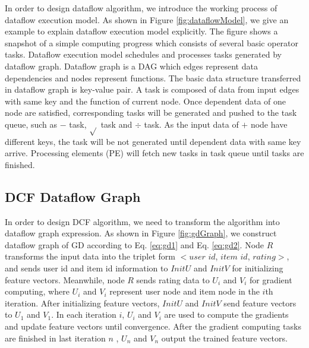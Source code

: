 \documentclass{llncs}
\begin{document}
In order to design dataflow algorithm, we introduce the working process of dataflow execution model. As shown in Figure \ref{fig:dataflowModel}, we give an example to explain dataflow execution model explicitly. The figure shows a snapshot of a simple computing progress which consists of several basic operator tasks. Dataflow execution model schedules and processes tasks generated by dataflow graph. Dataflow graph is a DAG which edges represent data dependencies and nodes represent functions. The basic data structure transferred in dataflow graph is key-value pair. A task is composed of data from input edges with same key and the function of current node. Once dependent data of one node are satisfied, corresponding tasks will be generated and pushed to the task queue, such as $-$ task, $\sqrt{ }$ task and $\div$ task. As the input data of $+$ node have different keys, the task will be not generated until dependent data with same key arrive. Processing elements (PE) will fetch new tasks in task queue until tasks are finished.



\vspace{-10pt}
\subsection{DCF Dataflow Graph}
\vspace{-5pt}
In order to design DCF algorithm, we need to transform the algorithm into dataflow graph expression. As shown in Figure \ref{fig:gdGraph}, we construct dataflow graph of GD according to Eq. \ref{eq:gd1} and Eq. \ref{eq:gd2}. Node $R$ transforms the input data into the triplet form $<user$ $id$, $item$ $id$, $rating>$, and sends user id and item id information to $InitU$ and $InitV$ for initializing feature vectors.
Meanwhile, node $R$ sends rating data to $U_i$ and $V_i$ for gradient computing, where $U_i$ and $V_i$ represent user node and item node in the $i$th iteration. After initializing feature vectors, $InitU$ and $InitV$ send feature vectors to $U_1$ and $V_1$. In each iteration $i$, $U_i$ and $V_i$ are used to compute the gradients and update feature vectors until convergence. After the gradient computing tasks are finished in last iteration $n$ , $U_n$ and $V_n$ output the trained feature vectors.

\vspace{-15pt}
\end{document}
